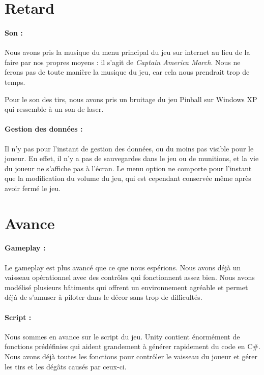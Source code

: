 \documentclass[10pt, titlepage]{report}
\begin{document}
\section{Retard}

\paragraph{Son :}
Nous avons pris la musique du menu principal du jeu sur internet au lieu de la faire par nos propres moyens : il s'agit de \textit{Captain America March}. Nous ne ferons pas de toute manière la musique du jeu, car cela nous prendrait trop de temps.

 Pour le son des tirs, nous avons pris un bruitage du jeu Pinball sur Windows XP qui ressemble à un son de laser.

\paragraph{Gestion des données :}
Il n'y pas pour l'instant de gestion des données, ou du moins pas visible pour le joueur. En effet, il n'y a pas de sauvegardes dans le jeu ou de munitions, et la vie du joueur ne s'affiche pas à l'écran. Le menu option ne comporte pour l'instant que la modification du volume du jeu, qui est cependant conservée même après avoir fermé le jeu.

\section{Avance}

\paragraph{Gameplay :}
Le gameplay est plus avancé que ce que nous espérions. Nous avons déjà un vaisseau opérationnel avec des contrôles qui fonctionnent assez bien. Nous avons modélisé plusieurs bâtiments qui offrent un environnement agréable et permet déjà de s'amuser à piloter dans le décor sans trop de difficultés.

\paragraph{Script :}
Nous sommes en avance sur le script du jeu. Unity contient énormément de fonctions prédéfinies qui aident grandement à générer rapidement du code en C\#. Nous avons déjà toutes les fonctions pour contrôler le vaisseau du joueur et gérer les tirs et les dégâts causés par ceux-ci.
\end{document}
